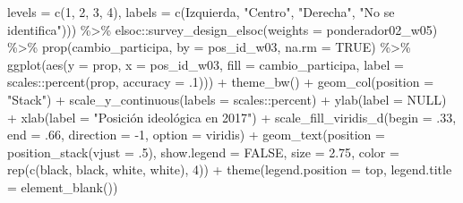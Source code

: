 \documentclass[
  12pt,
]{book}
\newenvironment{Shaded}{\begin{snugshade}}{\end{snugshade}}
\newcommand{\AttributeTok}[1]{\textcolor[rgb]{0.77,0.63,0.00}{#1}}
\newcommand{\ConstantTok}[1]{\textcolor[rgb]{0.00,0.00,0.00}{#1}}
\newcommand{\DecValTok}[1]{\textcolor[rgb]{0.00,0.00,0.81}{#1}}
\newcommand{\FloatTok}[1]{\textcolor[rgb]{0.00,0.00,0.81}{#1}}
\newcommand{\FunctionTok}[1]{\textcolor[rgb]{0.00,0.00,0.00}{#1}}
\newcommand{\NormalTok}[1]{#1}
\newcommand{\SpecialCharTok}[1]{\textcolor[rgb]{0.00,0.00,0.00}{#1}}
\newcommand{\StringTok}[1]{\textcolor[rgb]{0.31,0.60,0.02}{#1}}
\begin{document}
\begin{Shaded}
\begin{Highlighting}[]
                         \AttributeTok{levels =} \FunctionTok{c}\NormalTok{(}\DecValTok{1}\NormalTok{, }\DecValTok{2}\NormalTok{, }\DecValTok{3}\NormalTok{, }\DecValTok{4}\NormalTok{),}
                         \AttributeTok{labels =} \FunctionTok{c}\NormalTok{(}\StringTok{\textquotesingle{}Izquierda\textquotesingle{}}\NormalTok{, }\StringTok{"Centro"}\NormalTok{, }\StringTok{"Derecha"}\NormalTok{, }\StringTok{"No se identifica"}\NormalTok{))) }\SpecialCharTok{\%\textgreater{}\%} 
\NormalTok{  elsoc}\SpecialCharTok{::}\FunctionTok{survey\_design\_elsoc}\NormalTok{(}\AttributeTok{weights =} \StringTok{\textquotesingle{}ponderador02\_w05\textquotesingle{}}\NormalTok{) }\SpecialCharTok{\%\textgreater{}\%} 
  \FunctionTok{prop}\NormalTok{(cambio\_participa, }\AttributeTok{by =}\NormalTok{ pos\_id\_w03, }\AttributeTok{na.rm =} \ConstantTok{TRUE}\NormalTok{) }\SpecialCharTok{\%\textgreater{}\%} 
  \FunctionTok{ggplot}\NormalTok{(}\FunctionTok{aes}\NormalTok{(}\AttributeTok{y =}\NormalTok{ prop, }\AttributeTok{x =}\NormalTok{ pos\_id\_w03, }\AttributeTok{fill =}\NormalTok{ cambio\_participa, }
             \AttributeTok{label =}\NormalTok{ scales}\SpecialCharTok{::}\FunctionTok{percent}\NormalTok{(prop, }\AttributeTok{accuracy =}\NormalTok{ .}\DecValTok{1}\NormalTok{))) }\SpecialCharTok{+} 
  \FunctionTok{theme\_bw}\NormalTok{() }\SpecialCharTok{+} 
  \FunctionTok{geom\_col}\NormalTok{(}\AttributeTok{position =} \StringTok{"Stack"}\NormalTok{) }\SpecialCharTok{+}
  \FunctionTok{scale\_y\_continuous}\NormalTok{(}\AttributeTok{labels =}\NormalTok{ scales}\SpecialCharTok{::}\NormalTok{percent) }\SpecialCharTok{+} 
  \FunctionTok{ylab}\NormalTok{(}\AttributeTok{label =} \ConstantTok{NULL}\NormalTok{) }\SpecialCharTok{+}
  \FunctionTok{xlab}\NormalTok{(}\AttributeTok{label =} \StringTok{"Posición ideológica en 2017"}\NormalTok{) }\SpecialCharTok{+}
  \FunctionTok{scale\_fill\_viridis\_d}\NormalTok{(}\AttributeTok{begin =}\NormalTok{ .}\DecValTok{33}\NormalTok{, }\AttributeTok{end =}\NormalTok{ .}\DecValTok{66}\NormalTok{, }\AttributeTok{direction =} \SpecialCharTok{{-}}\DecValTok{1}\NormalTok{, }\AttributeTok{option =} \StringTok{\textquotesingle{}viridis\textquotesingle{}}\NormalTok{) }\SpecialCharTok{+} 
  \FunctionTok{geom\_text}\NormalTok{(}\AttributeTok{position =} \FunctionTok{position\_stack}\NormalTok{(}\AttributeTok{vjust =}\NormalTok{ .}\DecValTok{5}\NormalTok{),}
            \AttributeTok{show.legend =} \ConstantTok{FALSE}\NormalTok{,}
            \AttributeTok{size =} \FloatTok{2.75}\NormalTok{,}
            \AttributeTok{color =} \FunctionTok{rep}\NormalTok{(}\FunctionTok{c}\NormalTok{(}\StringTok{\textquotesingle{}black\textquotesingle{}}\NormalTok{, }\StringTok{\textquotesingle{}black\textquotesingle{}}\NormalTok{, }\StringTok{\textquotesingle{}white\textquotesingle{}}\NormalTok{, }\StringTok{\textquotesingle{}white\textquotesingle{}}\NormalTok{), }\DecValTok{4}\NormalTok{)) }\SpecialCharTok{+} 
  \FunctionTok{theme}\NormalTok{(}\AttributeTok{legend.position =} \StringTok{\textquotesingle{}top\textquotesingle{}}\NormalTok{,}
        \AttributeTok{legend.title =} \FunctionTok{element\_blank}\NormalTok{())}
\end{Highlighting}
\end{Shaded}
\end{document}
